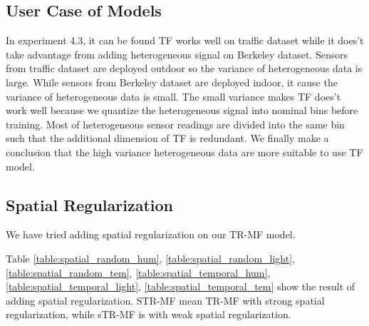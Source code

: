 \subsection{User Case of Models}


In experiment 4.3, it can be found TF works well on traffic dataset while it does't take advantage from adding heterogeneous signal on Berkeley dataset.
Sensors from traffic dataset are deployed outdoor so the variance of heterogeneous data is large.
While sensors from Berkeley dataset are deployed indoor, it cause the variance of heterogeneous data is small.
The small variance makes TF does't work well because we quantize the heterogeneous signal into nominal bins before training.
Most of heterogeneous sensor readings are divided into the same bin such that the additional dimension of TF is redundant.
We finally make a conclusion that the high variance heterogeneous data are more suitable to use TF model.

\subsection{Spatial Regularization}
We have tried adding spatial regularization on our TR-MF model. 



Table \ref{table:spatial_random_hum}, \ref{table:spatial_random_light}, \ref{table:spatial_random_tem}, \ref{table:spatial_temporal_hum}, \ref{table:spatial_temporal_light}, \ref{table:spatial_temporal_tem}  show the result of adding spatial regularization. STR-MF mean TR-MF with strong spatial regularization, while sTR-MF is with weak spatial regularization.

